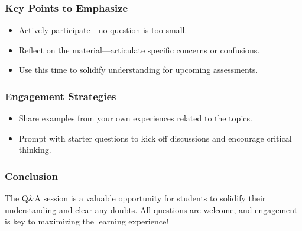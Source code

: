 \documentclass[aspectratio=169]{beamer}
\begin{document}
\begin{frame}[fragile]
    \frametitle{Key Points to Emphasize}
    \begin{itemize}
        \item Actively participate—no question is too small.
        \item Reflect on the material—articulate specific concerns or confusions.
        \item Use this time to solidify understanding for upcoming assessments.
    \end{itemize}
\end{frame}

\begin{frame}[fragile]
    \frametitle{Engagement Strategies}
    \begin{itemize}
        \item Share examples from your own experiences related to the topics.
        \item Prompt with starter questions to kick off discussions and encourage critical thinking.
    \end{itemize}
\end{frame}

\begin{frame}[fragile]
    \frametitle{Conclusion}
    The Q\&A session is a valuable opportunity for students to solidify their understanding and clear any doubts. 
    All questions are welcome, and engagement is key to maximizing the learning experience!
\end{frame}
\end{document}
